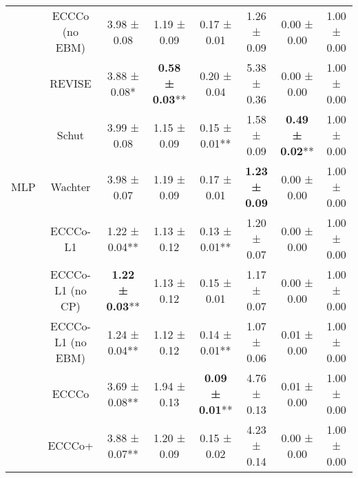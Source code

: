 \begin{table}
{\begin{tabular}[t]{cccccccc}
 & ECCCo (no EBM) & 3.98 ± 0.08\hphantom{*}\hphantom{*} & 1.19 ± 0.09\hphantom{*}\hphantom{*} & 0.17 ± 0.01\hphantom{*}\hphantom{*} & 1.26 ± 0.09\hphantom{*}\hphantom{*} & 0.00 ± 0.00\hphantom{*}\hphantom{*} & 1.00 ± 0.00\hphantom{*}\hphantom{*}\\

 & REVISE & 3.88 ± 0.08*\hphantom{*} & \textbf{0.58 ± 0.03}** & 0.20 ± 0.04\hphantom{*}\hphantom{*} & 5.38 ± 0.36\hphantom{*}\hphantom{*} & 0.00 ± 0.00\hphantom{*}\hphantom{*} & 1.00 ± 0.00\hphantom{*}\hphantom{*}\\

 & Schut & 3.99 ± 0.08\hphantom{*}\hphantom{*} & 1.15 ± 0.09\hphantom{*}\hphantom{*} & 0.15 ± 0.01** & 1.58 ± 0.09\hphantom{*}\hphantom{*} & \textbf{0.49 ± 0.02}** & 1.00 ± 0.00\hphantom{*}\hphantom{*}\\

\multirow[t]{-10}{*}{\centering\arraybackslash MLP} & Wachter & 3.98 ± 0.07\hphantom{*}\hphantom{*} & 1.19 ± 0.09\hphantom{*}\hphantom{*} & 0.17 ± 0.01\hphantom{*}\hphantom{*} & \textbf{1.23 ± 0.09}\hphantom{*}\hphantom{*} & 0.00 ± 0.00\hphantom{*}\hphantom{*} & 1.00 ± 0.00\hphantom{*}\hphantom{*}\\
\cmidrule{1-8}
 & ECCCo-L1 & 1.22 ± 0.04** & 1.13 ± 0.12\hphantom{*}\hphantom{*} & 0.13 ± 0.01** & 1.20 ± 0.07\hphantom{*}\hphantom{*} & 0.00 ± 0.00\hphantom{*}\hphantom{*} & 1.00 ± 0.00\hphantom{*}\hphantom{*}\\

 & ECCCo-L1 (no CP) & \textbf{1.22 ± 0.03}** & 1.13 ± 0.12\hphantom{*}\hphantom{*} & 0.15 ± 0.01\hphantom{*}\hphantom{*} & 1.17 ± 0.07\hphantom{*}\hphantom{*} & 0.00 ± 0.00\hphantom{*}\hphantom{*} & 1.00 ± 0.00\hphantom{*}\hphantom{*}\\

 & ECCCo-L1 (no EBM) & 1.24 ± 0.04** & 1.12 ± 0.12\hphantom{*}\hphantom{*} & 0.14 ± 0.01** & 1.07 ± 0.06\hphantom{*}\hphantom{*} & 0.01 ± 0.00\hphantom{*}\hphantom{*} & 1.00 ± 0.00\hphantom{*}\hphantom{*}\\

 & ECCCo & 3.69 ± 0.08** & 1.94 ± 0.13\hphantom{*}\hphantom{*} & \textbf{0.09 ± 0.01}** & 4.76 ± 0.13\hphantom{*}\hphantom{*} & 0.01 ± 0.00\hphantom{*}\hphantom{*} & 1.00 ± 0.00\hphantom{*}\hphantom{*}\\

 & ECCCo+ & 3.88 ± 0.07** & 1.20 ± 0.09\hphantom{*}\hphantom{*} & 0.15 ± 0.02\hphantom{*}\hphantom{*} & 4.23 ± 0.14\hphantom{*}\hphantom{*} & 0.00 ± 0.00\hphantom{*}\hphantom{*} & 1.00 ± 0.00\hphantom{*}\hphantom{*}\\


\end{tabular}}
\end{table}

